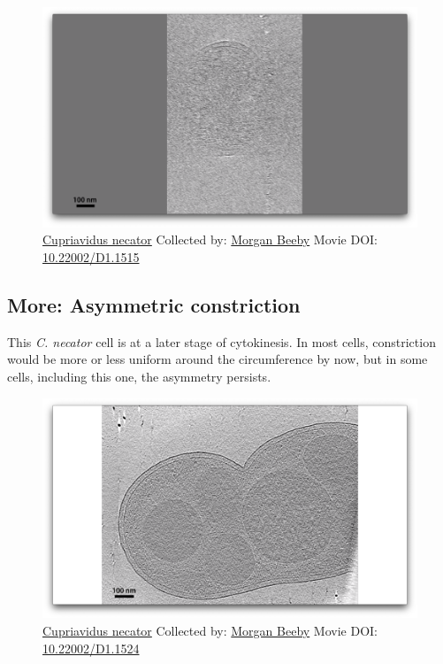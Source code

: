 \documentclass[]{tufte-book}
\begin{document}
\begin{figure}
\includegraphics{movie_stills/5_9} \caption[\protect\hyperlink{tree}{Cupriavidus necator} Collected by:
\protect\hyperlink{morgan_beeby}{Morgan Beeby} Movie DOI:
\href{https://doi.org/10.22002/D1.1515}{10.22002/D1.1515}]{\protect\hyperlink{tree}{Cupriavidus necator} Collected by:
\protect\hyperlink{morgan_beeby}{Morgan Beeby} Movie DOI:
\href{https://doi.org/10.22002/D1.1515}{10.22002/D1.1515}}\label{fig:5-9}
\end{figure}

\hypertarget{Asymmetric_constriction}{\subsection*{More: Asymmetric
constriction}\label{Asymmetric_constriction}}

This \emph{C. necator} cell is at a later stage of cytokinesis. In most
cells, constriction would be more or less uniform around the
circumference by now, but in some cells, including this one, the
asymmetry persists.





\begin{figure}
\includegraphics{movie_stills/5_9a} \caption[\protect\hyperlink{tree}{Cupriavidus necator} Collected by:
\protect\hyperlink{morgan_beeby}{Morgan Beeby} Movie DOI:
\href{https://doi.org/10.22002/D1.1524}{10.22002/D1.1524}]{\protect\hyperlink{tree}{Cupriavidus necator} Collected by:
\protect\hyperlink{morgan_beeby}{Morgan Beeby} Movie DOI:
\href{https://doi.org/10.22002/D1.1524}{10.22002/D1.1524}}\label{fig:5-9a}
\end{figure}
\end{document}
